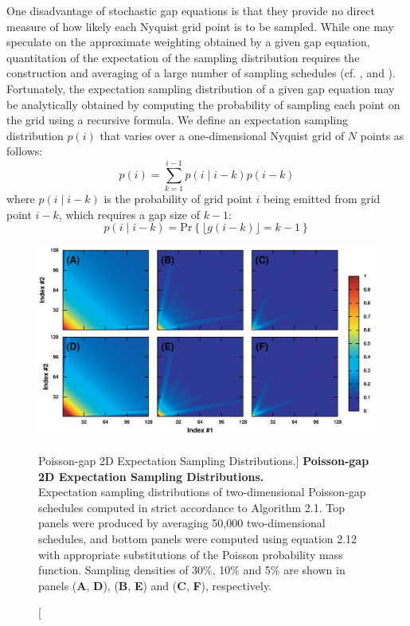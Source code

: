 \begin{doublespace}
One disadvantage of stochastic gap equations is that they provide no direct
measure of how likely each Nyquist grid point is to be sampled. While one may
speculate on the approximate weighting obtained by a given gap equation,
quantitation of the expectation of the sampling distribution requires the
construction and averaging of a large number of sampling schedules
(cf. ,  and ).
Fortunately, the expectation sampling distribution of a given gap equation
may be analytically obtained by computing the probability of sampling each
point on the grid using a recursive formula. We define an expectation
sampling distribution $p(i)$ that varies over a one-dimensional Nyquist
grid of $N$ points as follows:
\begin{equation}
p(i) = \sum_{k=1}^{i-1} p(i \mid i-k) p(i-k)
\end{equation}
where $p(i \mid i-k)$ is the probability of grid point $i$ being emitted from
grid point $i-k$, which requires a gap size of $k-1$:
\begin{equation}
p(i \mid i-k) = \mathrm{Pr}\left\{
 \lfloor g(i-k) \rfloor = k - 1
\right\}
\end{equation}
\end{doublespace}

\begin{figure}[ht!]
\includegraphics[width=6in]{figs/dgs/03-expect-2d.png}
\caption
      [Poisson-gap 2D Expectation Sampling Distributions.]{
  {\bf Poisson-gap 2D Expectation Sampling Distributions.}
  \\
  Expectation sampling distributions of two-dimensional Poisson-gap schedules
  computed in strict accordance to Algorithm 2.1. Top panels were produced by
  averaging 50,000 two-dimensional schedules, and bottom panels were computed
  using equation 2.12 with appropriate substitutions of the Poisson
  probability mass function. Sampling densities of 30\%, 10\% and 5\% are
  shown in panels ({\bf A}, {\bf D}), ({\bf B}, {\bf E}) and
  ({\bf C}, {\bf F}), respectively.
}
\label{figure.2.3}
\end{figure}

